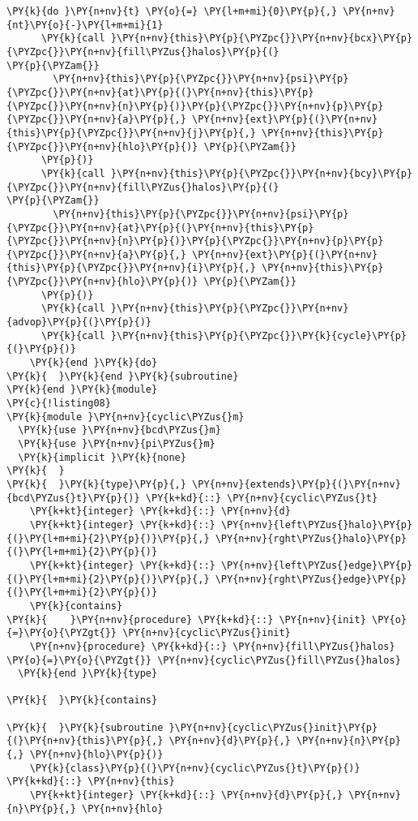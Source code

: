 \begin{Verbatim}[commandchars=\\\{\}]
    \PY{k}{do }\PY{n+nv}{t} \PY{o}{=} \PY{l+m+mi}{0}\PY{p}{,} \PY{n+nv}{nt}\PY{o}{-}\PY{l+m+mi}{1} 
      \PY{k}{call }\PY{n+nv}{this}\PY{p}{\PYZpc{}}\PY{n+nv}{bcx}\PY{p}{\PYZpc{}}\PY{n+nv}{fill\PYZus{}halos}\PY{p}{(}                        \PY{p}{\PYZam{}}
        \PY{n+nv}{this}\PY{p}{\PYZpc{}}\PY{n+nv}{psi}\PY{p}{\PYZpc{}}\PY{n+nv}{at}\PY{p}{(}\PY{n+nv}{this}\PY{p}{\PYZpc{}}\PY{n+nv}{n}\PY{p}{)}\PY{p}{\PYZpc{}}\PY{n+nv}{p}\PY{p}{\PYZpc{}}\PY{n+nv}{a}\PY{p}{,} \PY{n+nv}{ext}\PY{p}{(}\PY{n+nv}{this}\PY{p}{\PYZpc{}}\PY{n+nv}{j}\PY{p}{,} \PY{n+nv}{this}\PY{p}{\PYZpc{}}\PY{n+nv}{hlo}\PY{p}{)} \PY{p}{\PYZam{}}
      \PY{p}{)}
      \PY{k}{call }\PY{n+nv}{this}\PY{p}{\PYZpc{}}\PY{n+nv}{bcy}\PY{p}{\PYZpc{}}\PY{n+nv}{fill\PYZus{}halos}\PY{p}{(}                        \PY{p}{\PYZam{}}
        \PY{n+nv}{this}\PY{p}{\PYZpc{}}\PY{n+nv}{psi}\PY{p}{\PYZpc{}}\PY{n+nv}{at}\PY{p}{(}\PY{n+nv}{this}\PY{p}{\PYZpc{}}\PY{n+nv}{n}\PY{p}{)}\PY{p}{\PYZpc{}}\PY{n+nv}{p}\PY{p}{\PYZpc{}}\PY{n+nv}{a}\PY{p}{,} \PY{n+nv}{ext}\PY{p}{(}\PY{n+nv}{this}\PY{p}{\PYZpc{}}\PY{n+nv}{i}\PY{p}{,} \PY{n+nv}{this}\PY{p}{\PYZpc{}}\PY{n+nv}{hlo}\PY{p}{)} \PY{p}{\PYZam{}}
      \PY{p}{)}
      \PY{k}{call }\PY{n+nv}{this}\PY{p}{\PYZpc{}}\PY{n+nv}{advop}\PY{p}{(}\PY{p}{)}
      \PY{k}{call }\PY{n+nv}{this}\PY{p}{\PYZpc{}}\PY{k}{cycle}\PY{p}{(}\PY{p}{)}
    \PY{k}{end }\PY{k}{do}
\PY{k}{  }\PY{k}{end }\PY{k}{subroutine}
\PY{k}{end }\PY{k}{module}
\PY{c}{!listing08}
\PY{k}{module }\PY{n+nv}{cyclic\PYZus{}m}
  \PY{k}{use }\PY{n+nv}{bcd\PYZus{}m}
  \PY{k}{use }\PY{n+nv}{pi\PYZus{}m}
  \PY{k}{implicit }\PY{k}{none}
\PY{k}{  }
\PY{k}{  }\PY{k}{type}\PY{p}{,} \PY{n+nv}{extends}\PY{p}{(}\PY{n+nv}{bcd\PYZus{}t}\PY{p}{)} \PY{k+kd}{::} \PY{n+nv}{cyclic\PYZus{}t}
    \PY{k+kt}{integer} \PY{k+kd}{::} \PY{n+nv}{d}
    \PY{k+kt}{integer} \PY{k+kd}{::} \PY{n+nv}{left\PYZus{}halo}\PY{p}{(}\PY{l+m+mi}{2}\PY{p}{)}\PY{p}{,} \PY{n+nv}{rght\PYZus{}halo}\PY{p}{(}\PY{l+m+mi}{2}\PY{p}{)} 
    \PY{k+kt}{integer} \PY{k+kd}{::} \PY{n+nv}{left\PYZus{}edge}\PY{p}{(}\PY{l+m+mi}{2}\PY{p}{)}\PY{p}{,} \PY{n+nv}{rght\PYZus{}edge}\PY{p}{(}\PY{l+m+mi}{2}\PY{p}{)} 
    \PY{k}{contains}
\PY{k}{    }\PY{n+nv}{procedure} \PY{k+kd}{::} \PY{n+nv}{init} \PY{o}{=}\PY{o}{\PYZgt{}} \PY{n+nv}{cyclic\PYZus{}init}
    \PY{n+nv}{procedure} \PY{k+kd}{::} \PY{n+nv}{fill\PYZus{}halos} \PY{o}{=}\PY{o}{\PYZgt{}} \PY{n+nv}{cyclic\PYZus{}fill\PYZus{}halos}
  \PY{k}{end }\PY{k}{type}

\PY{k}{  }\PY{k}{contains}

\PY{k}{  }\PY{k}{subroutine }\PY{n+nv}{cyclic\PYZus{}init}\PY{p}{(}\PY{n+nv}{this}\PY{p}{,} \PY{n+nv}{d}\PY{p}{,} \PY{n+nv}{n}\PY{p}{,} \PY{n+nv}{hlo}\PY{p}{)}
    \PY{k}{class}\PY{p}{(}\PY{n+nv}{cyclic\PYZus{}t}\PY{p}{)} \PY{k+kd}{::} \PY{n+nv}{this}
    \PY{k+kt}{integer} \PY{k+kd}{::} \PY{n+nv}{d}\PY{p}{,} \PY{n+nv}{n}\PY{p}{,} \PY{n+nv}{hlo}


\end{Verbatim}
